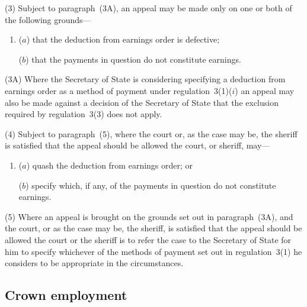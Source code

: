 \documentclass[12pt,a4paper]{article}
\begin{document}
(3) 
Subject to paragraph~(3A),  %
an appeal may be made only on one or both of the following grounds—
\begin{enumerate}\item[]
($a$) that the deduction from earnings order is defective;

($b$) that the payments in question do not constitute earnings.
\end{enumerate}

(3A) Where the Secretary of State is considering specifying a deduction from earnings order as a method of payment under regulation~3(1)($i$)  an appeal may also be made against a decision of the Secretary of State that the exclusion required by regulation~3(3) does not apply.

(4) 
Subject to paragraph~(5),  %
where the court or, as the case may be, the sheriff is satisfied that the appeal should be allowed the court, or sheriff, may—
\begin{enumerate}\item[]
($a$) quash the deduction from earnings order; or

($b$) specify which, if any, of the payments in question do not constitute earnings.\end{enumerate}

(5) Where an appeal is brought on the grounds set out in paragraph~(3A), and the court, or as the case may be, the sheriff, is satisfied that the appeal should be allowed the court or the sheriff is to refer the case to the Secretary of State for him to specify whichever of the methods of payment set out in regulation~3(1) he considers to be appropriate in the circumstances.


\subsection[23. Crown employment]{Crown employment}
\end{document}
